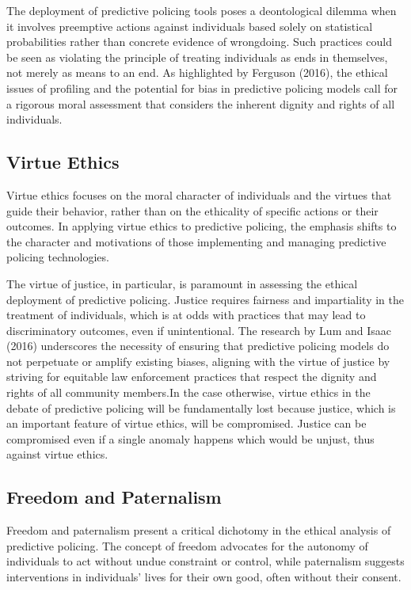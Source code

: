 \documentclass[man, noextraspace]{apa7} %
\begin{document}
The deployment of predictive policing tools poses a deontological dilemma when it involves preemptive actions against individuals based solely on statistical probabilities rather than concrete evidence of wrongdoing. Such practices could be seen as violating the principle of treating individuals as ends in themselves, not merely as means to an end. As highlighted by Ferguson (2016), the ethical issues of profiling and the potential for bias in predictive policing models call for a rigorous moral assessment that considers the inherent dignity and rights of all individuals.

\subsection{Virtue Ethics}
Virtue ethics focuses on the moral character of individuals and the virtues that guide their behavior, rather than on the ethicality of specific actions or their outcomes. In applying virtue ethics to predictive policing, the emphasis shifts to the character and motivations of those implementing and managing predictive policing technologies.

The virtue of justice, in particular, is paramount in assessing the ethical deployment of predictive policing. Justice requires fairness and impartiality in the treatment of individuals, which is at odds with practices that may lead to discriminatory outcomes, even if unintentional. The research by Lum and Isaac (2016) underscores the necessity of ensuring that predictive policing models do not perpetuate or amplify existing biases, aligning with the virtue of justice by striving for equitable law enforcement practices that respect the dignity and rights of all community members.In the case otherwise, virtue ethics in the debate of predictive policing will be fundamentally lost because justice, which is an important feature of virtue ethics, will be compromised. Justice can be compromised even if a single anomaly happens which would be unjust, thus against virtue ethics.

\subsection{Freedom and Paternalism}
Freedom and paternalism present a critical dichotomy in the ethical analysis of predictive policing. The concept of freedom advocates for the autonomy of individuals to act without undue constraint or control, while paternalism suggests interventions in individuals' lives for their own good, often without their consent.
\end{document}
